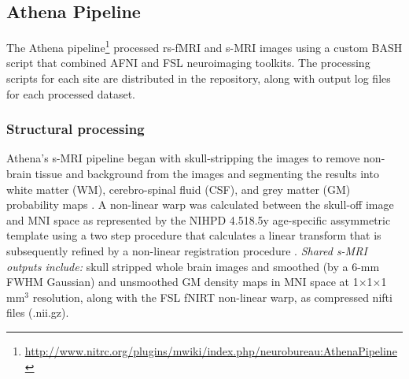 \documentclass[preprint,12pt,5p]{elsarticle}
\begin{document}
\begin{itemize}
\subsection{Athena Pipeline} 
The Athena pipeline\footnote{\url{http://www.nitrc.org/plugins/mwiki/index.php/neurobureau:AthenaPipeline}}  processed rs-fMRI and s-MRI images using a custom BASH script that combined AFNI \cite{cox1996afni} and FSL \cite{smith2004advances} neuroimaging toolkits. The processing scripts for each site are distributed in the repository, along with output log files for each processed dataset.

\subsubsection{Structural processing} Athena's s-MRI pipeline began with skull-stripping the images to remove non-brain tissue and background from the images \cite{smith2002_bet} and segmenting the results into white matter (WM), cerebro-spinal fluid (CSF), and grey matter (GM) probability maps \cite{zhang2001_fast}. A non-linear warp was calculated between the skull-off image and MNI space as represented by the NIHPD 4.5\textendash18.5y age-specific assymmetric template \cite{fonov2011unbiased} using a two step procedure that calculates a linear transform \cite{jenkinson2002_flirt} that is subsequently refined by a non-linear registration procedure \cite{andersson2007non}. \emph{Shared s-MRI outputs include:} skull stripped whole brain images and smoothed (by a 6-mm FWHM Gaussian) and unsmoothed GM density maps in MNI space at 1$\times$1$\times$1 mm$^3$ resolution, along with the FSL fNIRT non-linear warp, as compressed nifti files (.nii.gz). 


\end{itemize}
\end{document}
